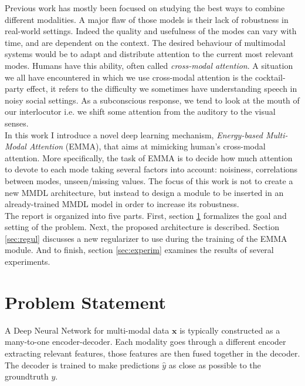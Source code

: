 \documentclass[12pt]{report}
\begin{document}
\indent Previous work has mostly been focused on studying the best ways to combine different modalities. A major flaw of those models is their lack of robustness in real-world settings. Indeed the quality and usefulness of the modes can vary with time, and are dependent on the context. The desired behaviour of multimodal systems would be to adapt and distribute attention to the current most relevant modes. Humans have this ability, often called \textit{cross-modal attention}\cite{crossmodal}. A situation we all have encountered in which we use cross-modal attention is the cocktail-party effect\cite{cocktail-party}, it refers to the difficulty we sometimes have understanding speech in noisy social settings. As a subconscious response, we tend to look at the mouth of our interlocutor i.e. we shift some attention from the auditory to the visual senses.\\

\indent In this work I introduce a novel deep learning mechanism, \textit{Energy-based Multi-Modal Attention} (EMMA), that aims at mimicking human's cross-modal attention. More specifically, the task of EMMA  is to decide how much attention to devote to each mode taking several factors into account: noisiness, correlations between modes, unseen/missing values. The focus of this work is not to create a new MMDL architecture, but instead to design a module to be inserted in an already-trained MMDL model in order to increase its robustness. \\

\indent The report is organized into five parts. First, section \ref{sec:problem} formalizes the goal and setting of the problem. Next, the proposed architecture is described. Section \ref{sec:regul} discusses a new regularizer to use during the training of the EMMA module. And to finish, section \ref{sec:experim} examines the results of several experiments.


\section{Problem Statement}\label{sec:problem}

A Deep Neural Network for multi-modal data $\mathbf{x}$ is typically constructed as a many-to-one encoder-decoder. Each modality goes through a different encoder extracting relevant features, those features are then fused together in the decoder. The decoder is trained to make predictions $\hat{y}$ as close as possible to the groundtruth $y$.\\
\end{document}
